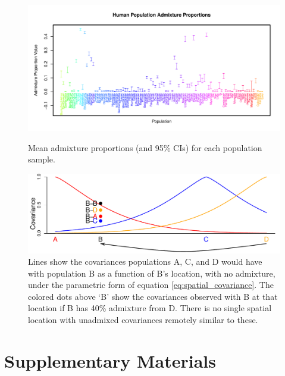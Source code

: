 \documentclass[10pt,letterpaper]{article}
\begin{document}
\begin{figure}
			{\includegraphics[width=\textwidth,height=0.45\textwidth]{../figs/globetrotter/globe_adprop.pdf}}
	\caption{Mean admixture proportions (and 95\% CIs) for each population sample.
	\label{globe_ad_props}
    }
\end{figure}

\begin{figure}[htp!]
	\centering
	\includegraphics[width=\textwidth]{../figs/sims/Admix_covar_toy_fig.pdf}
	\caption{
    Lines show the covariances populations A, C, and D would have with population B as a function of B's location,
    with no admixture,
    under the parametric form of equation \eqref{eq:spatial_covariance}.
    The colored dots above `B' show the covariances observed with B at that location if B has 40\% admixture from D.
    There is no single spatial location with unadmixed covariances remotely similar to these.
    } \label{sfig:toy_admixture}
\end{figure}

\newpage
\section*{Supplementary Materials}
\renewcommand{\thefigure}{S\arabic{figure}}
\setcounter{figure}{0}
\renewcommand{\thetable}{S\arabic{table}}
\setcounter{table}{0}
\renewcommand{\theequation}{S\arabic{table}}
\setcounter{equation}{0}
\end{document}
